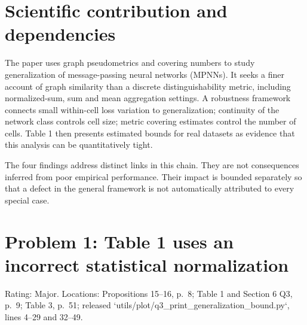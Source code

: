\documentclass[10pt]{article}
\begin{document}
\section*{Scientific contribution and dependencies}
The paper uses graph pseudometrics and covering numbers to study generalization of message-passing neural networks (MPNNs). It seeks a finer account of graph similarity than a discrete distinguishability metric, including normalized-sum, sum and mean aggregation settings. A robustness framework connects small within-cell loss variation to generalization; continuity of the network class controls cell size; metric covering estimates control the number of cells. Table 1 then presents estimated bounds for real datasets as evidence that this analysis can be quantitatively tight.\par
The four findings address distinct links in this chain. They are not consequences inferred from poor empirical performance. Their impact is bounded separately so that a defect in the general framework is not automatically attributed to every special case.\par
\section*{Problem 1: Table 1 uses an incorrect statistical normalization}
Rating: Major. Locations: Propositions 15–16, p. 8; Table 1 and Section 6 Q3, p. 9; Table 3, p. 51; released `utils/plot/q3\_print\_generalization\_bound.py`, lines 4–29 and 32–49.\par
\end{document}
